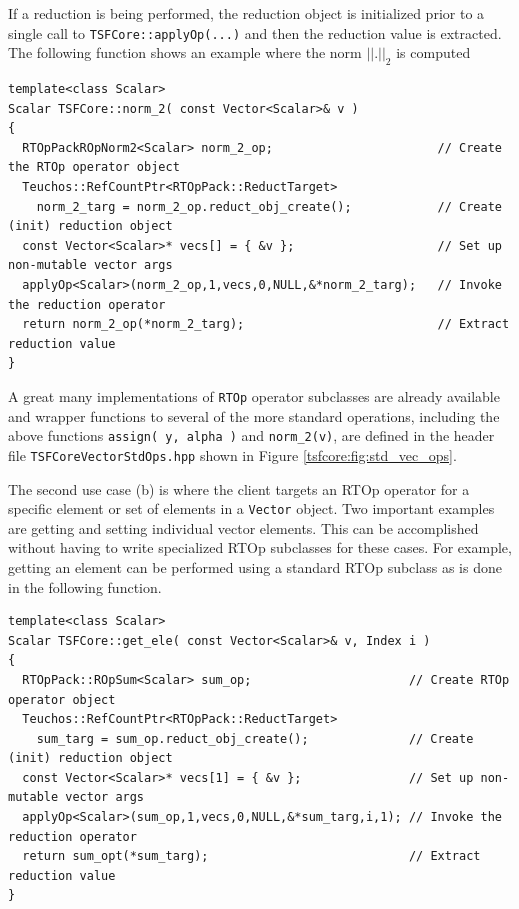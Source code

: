 If a reduction is being performed, the reduction object is initialized
prior to a single call to {}\texttt{TSFCore::applyOp(\-...)} and then
the reduction value is extracted.  The following function shows an
example where the norm $||.||_2$ is computed

{\scriptsize\begin{verbatim}
template<class Scalar>
Scalar TSFCore::norm_2( const Vector<Scalar>& v )
{
  RTOpPackROpNorm2<Scalar> norm_2_op;                       // Create the RTOp operator object
  Teuchos::RefCountPtr<RTOpPack::ReductTarget>
    norm_2_targ = norm_2_op.reduct_obj_create();            // Create (init) reduction object
  const Vector<Scalar>* vecs[] = { &v };                    // Set up non-mutable vector args
  applyOp<Scalar>(norm_2_op,1,vecs,0,NULL,&*norm_2_targ);   // Invoke the reduction operator
  return norm_2_op(*norm_2_targ);                           // Extract reduction value
}
\end{verbatim}}

{}\noindent{}A great many implementations of {}\texttt{RTOp} operator
subclasses are already available and wrapper functions to several of
the more standard operations, including the above functions
{}\texttt{assign( y, alpha )} and {}\texttt{norm\_2(v)}, are defined
in the header file {}\texttt{TSFCore\-Vector\-Std\-Ops.hpp} shown in
Figure {}\ref{tsfcore:fig:std_vec_ops}.

The second use case (b) is where the client targets an RTOp operator
for a specific element or set of elements in a {}\texttt{Vector}
object.  Two important examples are getting and setting individual
vector elements.  This can be accomplished without having to write
specialized RTOp subclasses for these cases.  For example, getting an
element can be performed using a standard RTOp subclass as is done in
the following function.

{\scriptsize\begin{verbatim}
template<class Scalar>
Scalar TSFCore::get_ele( const Vector<Scalar>& v, Index i )
{
  RTOpPack::ROpSum<Scalar> sum_op;                      // Create RTOp operator object
  Teuchos::RefCountPtr<RTOpPack::ReductTarget>
    sum_targ = sum_op.reduct_obj_create();              // Create (init) reduction object
  const Vector<Scalar>* vecs[1] = { &v };               // Set up non-mutable vector args
  applyOp<Scalar>(sum_op,1,vecs,0,NULL,&*sum_targ,i,1); // Invoke the reduction operator
  return sum_opt(*sum_targ);                            // Extract reduction value
}
\end{verbatim}}

